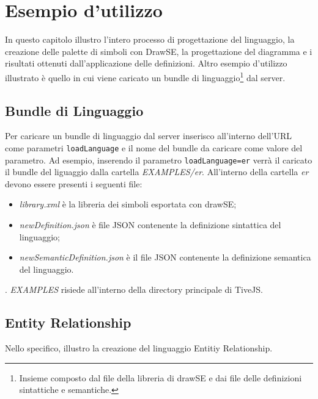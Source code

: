 ﻿\chapter{Esempio d'utilizzo}
    In questo capitolo illustro l'intero processo di progettazione del linguaggio, la creazione delle palette di simboli con DrawSE, la progettazione del diagramma e i risultati ottenuti dall'applicazione delle definizioni. Altro esempio d'utilizzo illustrato è quello in cui viene caricato un bundle di linguaggio\footnote{Insieme composto dal file della libreria di drawSE e dai file delle definizioni sintattiche e semantiche.} dal server.

    \section{Bundle di Linguaggio}
        Per caricare un bundle di linguaggio dal server inserisco all'interno dell'URL come parametri \texttt{loadLanguage} e il nome del bundle da caricare come valore del parametro. Ad esempio, inserendo il parametro \texttt{loadLanguage=er} verrà il caricato il bundle del liguaggio dalla cartella \textit{EXAMPLES/er}. All'interno della cartella \textit{er} devono essere presenti i seguenti file:
        \begin{itemize}
            \item \textit{library.xml} è la libreria dei simboli esportata con drawSE;
            \item \textit{newDefinition.json} è file JSON contenente la definizione sintattica del linguaggio;
            \item \textit{newSemanticDefinition.json} è il file JSON contenente la definizione semantica del linguaggio.
        \end{itemize}.
        \textit{EXAMPLES} risiede all'interno della directory principale di TiveJS.

    \section{Entity Relationship}
        Nello specifico, illustro la creazione del linguaggio Entitiy Relationship.

